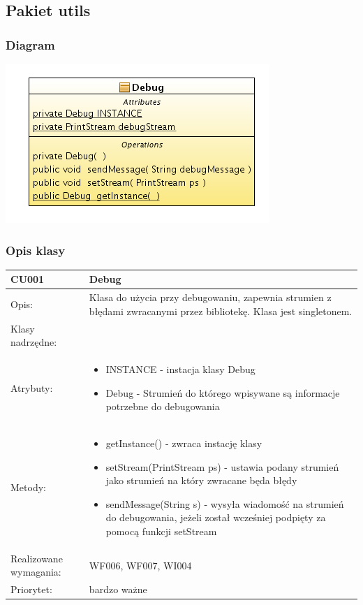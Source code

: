 \subsection{Pakiet utils}

\subsubsection{Diagram}

\includegraphics[width=0.5\linewidth]{./modelowanie/OV_UML/UtilsDiagram.png}

\subsubsection{Opis klasy}

\begin{center}

\begin{tabular}{|m{3cm}|m{9cm}|} \hline

CU001 & Debug \\ \hline
Opis: & Klasa do użycia przy debugowaniu, zapewnia strumien z błędami zwracanymi przez bibliotekę. Klasa jest singletonem.\\ \hline
Klasy nadrzędne: &     \\ \hline
Atrybuty: & \begin{itemize}
 \item INSTANCE - instacja klasy Debug
 \item Debug - Strumień do którego wpisywane są informacje potrzebne do debugowania
\end{itemize}
 \\ \hline
Metody: & \begin{itemize}
 \item getInstance() - zwraca instację klasy
 \item setStream(PrintStream ps) - ustawia podany strumień jako strumień na który zwracane będa błędy
 \item sendMessage(String s) - wysyła wiadomość na strumień do debugowania, jeżeli został wcześniej podpięty za pomocą funkcji setStream 	
\end{itemize}
  \\ \hline
Realizowane wymagania: & WF006, WF007, WI004 \\ \hline
Priorytet: & bardzo ważne  \\ \hline

\end{tabular}
\end{center}



